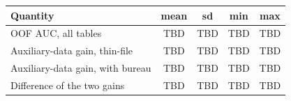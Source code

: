 \begin{tabular}{lcccc}
\toprule
Quantity & mean & sd & min & max\\
\midrule
OOF AUC, all tables & TBD & TBD & TBD & TBD\\
Auxiliary-data gain, thin-file & TBD & TBD & TBD & TBD\\
Auxiliary-data gain, with bureau & TBD & TBD & TBD & TBD\\
Difference of the two gains & TBD & TBD & TBD & TBD\\
\bottomrule
\end{tabular}

